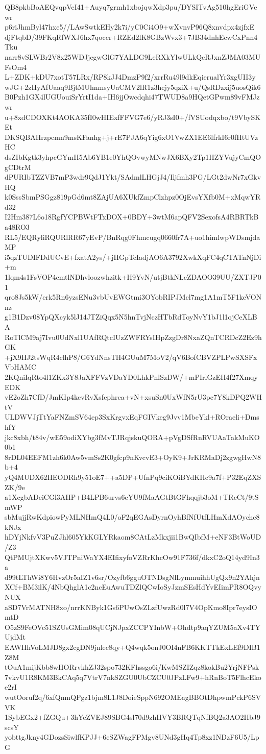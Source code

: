 QB8pkbBoAEQvqpVeI41+Auyq7grmh1xbojqwXdp3pu/DYSITvAg510hgEriGVewr
p6riJhmByl47hxe5//LAwSwtkEHy2k7i/yC0Ci4O9+wXvnvP96Q8xnvdpx4zjfxE
djFtqbD/39FKqRfWXJ6hx7qoccr+RZEd2lK8GBzWvx3+7JB34dnhEcwCxPnn4Tku
narr8vSLWBr2V8x25WDJjegwGlG7YALDG9LeRXkYlwULkQcRJxnZJMA03MUFsOm4
L+ZDK+kDU7xotT57LRx/RP8kJJ4DmzP9f2/xrrRu49l9dkEqierualYr3xgUII3y
wJG+2zHyAfUaaq9BjtMUhnmsyUaCMV2lR1z3hcjy5qziX+u/QsRDzxij5uosQik6
B0Pzh1GX4lUGUouiSrYrtI1da+IH6jjOwcdqhi47TWUD8a9HQetGPwm89vFMJzwr
u+8xdCDOXKt4AOKA35fI0wHIExfFFVG7e6/yRJ3sI0+/fVSUodqxbo/t9VbySKEt
DKSQBAHrzpcmn9msKFanhg+j+rE7PJA6qYig6xO1VwZX1EE6lfrkI6r0fHtUVzHC
dsZIbKgtk3yhpcGYmH5Ab6YB1e0YhQOvwyMNwJX6BXy2Tp1HZYVujyCmQOgCDtrM
dPURIbTZZVB7mP3wdr9QdJ1Ykt/SAdmlLHGjJ4/Iljfmh3PG/LGt2dwNr7xGkvHQ
k0SssSbmPSGgz819pGd6mt8ZAjUA6XUkfZmpClzhpz0OjEvsYXfb0M+xMqwYRd32
I2Hm387L6o18RgfYCPBWtFTxDOX+0BDY+3wtM6apQFV2SexofsA4RBRTkBa48RO3
RL5/EQRyliRQURlRR67yEvP/BnRqg0Fhmcugq0660fr7A+uo1himlwpWDsmjdaMP
i5qzTUDIFDdUCvE+fxatA2ys/+jHGpTcIadjAO6A3792XwkXqFC4qCTATnNjDi+m
1lqm4s1FsVOP4cmtlNDhvloozwhzitk+H9YvN/utjBtkNLcZDAOO39UU/ZXTJP01
qro8Js5kW/erk5Rn6yzsENu3vbUvEWGtmi3OYobRIPJMcl7mg1A1mT5F1keVONnz
g1B1Dzv08YpQXcyk5lJ14JTZiQqx5N5hnTvjNczHTbRdToyNvY1bJ1l1ojCeXLBA
RoTlCM9aj7Ivu0UdNxl1UAfRQtcIUzZWFRYsIHpZzgDr8NxaZQnTCRDcZ2Ez9hGK
+jX9HJ2tsWqR4clhP8/G6YdNnsTH4GUuM7MoV2/qV6BofCBVZPLPwSXSFxVbHAMC
2KQniIqRto4l1ZKx3Y8JaXFFVzVDaYD0LhkPnlSzDW/+mPIrlGzEH4f27XmqyEDK
vE2oZh7CfD/JmKIp4kcvRvXsfephrca+vN+xsuSn0UxWfN5rU3pc7Y8kDPQ2WHtV
ULDWVJjTtYaFNZmSV64ep3SxKrgvxEqFGIVkeg9Jvv1MbeYkl+ROraeli+DmshfY
jkc8xbh/t84v/wE59odiXYbg3fMvTJRqjskuQORA+pVgDSfRnRVUAaTakMuKO0b1
8rDL04EEFM1zh6k0Aw5vmSs2K0gfcp9nKvcvE3+OyK9+JrKRMaDj2zgwgHwN8b+4
yQ4MUDX62HEODRh9y51oE7++a5DP+UfnPq9ciKOiBYdKHc9a7f+P32EqZXSZK/9e
a1XcgbADeiCGl3AHP+B4LPB6urvs6eYU9fMaAGtBtGFhqqjb3oM+TRcCt/9tSmWP
sbMujjRwKdpiowPyMLNHmQ4L0/oF2qEGAsDyrnOyhBfNfUtfLHmXdAOychc8kNJx
hDYjNkfvV3PuZJhl605YkKGLYRkaom8CAtLzMkxjii1BwQIbfM+eNF3BtWoUD/Z3
QtPMUjtXKwv5VJTPniWaYX4EIfixyfoVZRrKhcOw91F736f/dkxC2oQ14yd9In3a
d99tLThWi8Y6HvzOr5aIZ1v6sr/Ozyfb6gguOTNDsgNlLymmuihhUgQx9n2YAhjn
XCf+BM3ilK/4NbQhglA1c2ncEuAwuTDZlQCwIoSyJzmSEsHdYvEIimPR8OQvyNUX
aSD7VrMATNH8xo/nrrKNByk1Gs6PUwOsZLzfUwzRd0l7V4OpKmo8Ipr7eysIOmtD
O5zS9FeOVc51SZUsGMim08qUCjNJpxZCCPYInbW+Ohdtp9aqYZUM5aXv4TYUjdMt
EAWHhVoLMJD8gx2cgDN9jnlec8qy+Q4wqk5onJ0OI4nFB6KKTTkExLEf9DIB1Z8M
tOuA1mijKbb8wHORrvkhZJ32spo732KFhssgo6i/KwMSZIZqz8kokBu2YrjNFPsk
7vkvU1R8KM3BkCAq5q7VtrV7nkSZGU0UbCZCU0JPzLFw9+hRnBoT5FlhcEkoe2rI
wutOoruf2q/6xfQnmQPgz1bjm8L1J8DoieSppN692OMEagBBOtDhpwmPckP6SVVK
1SybEGx2+fZGQu+3hYcZVEJ89SBG4sl70d9zhHVY3BRQTqNfBQ2a3AO2HbJ9scsY
yobttgJkny4GDozsSiwlfKPJJ+6eSZWagFPMgv8UNd3gHq4Tp8xz1NDzF6U5/LpG
